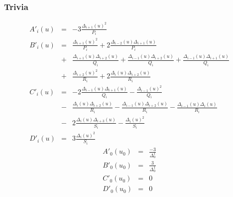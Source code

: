 \documentclass[a4paper,10pt,twosided]{article}
\begin{document}
\subsubsection{Trivia}
\begin{eqnarray*}
     A'_i(u) &=& -3\frac{\Delta_{i+1}(u)^2}{P_i}  
\\   B'_i(u) &=&   \frac{\Delta_{i+1}(u)^2}{P_i}               +  2\frac{\Delta_{i-2}(u)\Delta_{i+1}(u) }{P_i} 
        \\   &+&   \frac{\Delta_{i+1}(u)\Delta_{i+2}(u) }{Q_i} +   \frac{\Delta_{i-1}(u)\Delta_{i+2}(u) }{Q_i} + \frac{\Delta_{i-1}(u)\Delta_{i+1}(u) }{Q_i} 
        \\   &+&   \frac{\Delta_{i+2}(u)^2 }{R_i}              + 2 \frac{\Delta_i    (u)\Delta_{i+2}(u) }{R_i}                     
\\   C'_i(u) &=& -2\frac{\Delta_{i-1}(u)\Delta_{i+1}(u)}{Q_i}  -   \frac{\Delta_{i-1}(u)^2 }{Q_i}                                  
        \\   &-&   \frac{\Delta_i    (u)\Delta_{i+2}(u)}{R_i}  -   \frac{\Delta_{i-1}(u)\Delta_{i+2}(u) }{R_i} - \frac{\Delta_{i-1}(u)\Delta_i(u) }{R_i} 
        \\   &-&  2\frac{\Delta_i    (u)\Delta_{i+3}(u)}{S_i}  -   \frac{\Delta_i    (u)^2 }{S_i}
\\   D'_i(u) &=&  3\frac{\Delta_i    (u)^2 }{S_i}
\end{eqnarray*}
\begin{eqnarray*}
     A'_0(u_0) &=& \frac{-3}{\Delta_0^1}  
\\   B'_0(u_0) &=&  \frac{3 }{\Delta_0^1} 
\\   C'_0(u_0) &=&  0
\\   D'_0(u_0) &=&  0
\end{eqnarray*}
\end{document}
